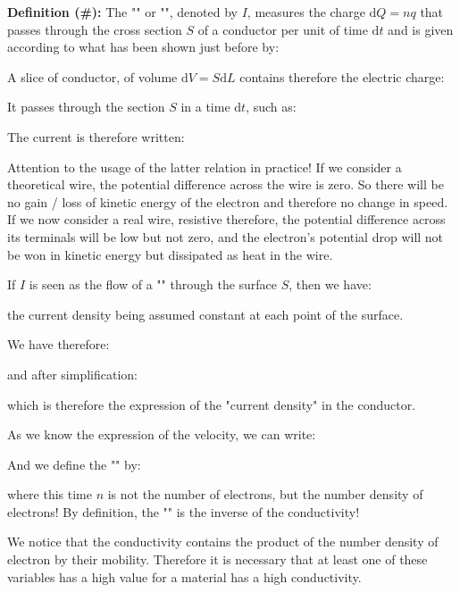 	\textbf{Definition (\#\mydef):} The "" or "", denoted by $I$,  measures the charge $\mathrm{d}Q=nq$ that passes through the cross section $S$ of a conductor per unit of time $\mathrm{d}t$ and is given according to what has been shown just before by:
	
	A slice of conductor, of volume $\mathrm{d}V=S\mathrm{d}L$ contains therefore the electric charge:
	
	It passes through the section $S$ in a time $\mathrm{d}t$, such as:
	
	The current is therefore written:
	
	\begin{tcolorbox}[title=Remark,colframe=black,arc=10pt]
	Attention to the usage of the latter relation in practice! If we consider a theoretical wire, the potential difference across the wire is zero. So there will be no gain / loss of kinetic energy of the electron and therefore no change in speed. If we now consider a real wire, resistive therefore, the potential difference across its terminals will be low but not zero, and the electron's potential drop will not be won in kinetic energy but dissipated as heat in the wire.
	\end{tcolorbox}
	If $I$ is seen as the flow of a "\label{current density}" through the surface $S$, then we have:
	
	the current density being assumed constant at each point of the surface.
	
	We have therefore:
	
	and after simplification:
	
	which is therefore the expression of the "current density" in the conductor.

	As we know the expression of the velocity, we can write:
	
	And we define the "" by:
	
	where this time $n$ is not the number of electrons, but the number density of electrons! By definition, the "" is the inverse of the conductivity!
	
	We notice that the conductivity contains the product of the number density of electron by their mobility. Therefore it is necessary that at least one of these variables has a high value for a material has a high conductivity.
	
